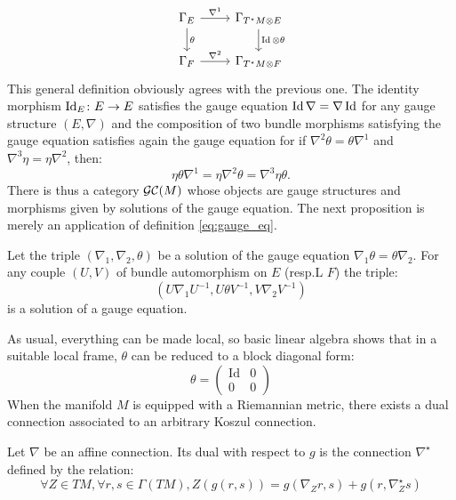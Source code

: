 \begin{equation}
    \label{eq:koszul_exterior_der}
    \begin{tikzcd}
    \Gamma_E \rar["\nabla^1"] \dar["\theta"] & \Gamma_{T^\star M  \otimes E} \dar["\Id \otimes \theta"]\\
    \Gamma_F \rar["\nabla^2"] & \Gamma_{T^\star M \otimes F}
    \end{tikzcd}
\end{equation}
This general definition obviously agrees with the previous one. 
The identity morphism $\operatorname{Id}_E \colon E \to E$ satisfies the gauge equation $\operatorname{Id} \nabla = \nabla \operatorname{Id}$
 for any gauge structure $\left(E,\nabla\right)$ and the composition of two bundle morphisms satisfying the gauge equation satisfies
  again the gauge equation for if $\nabla^2 \theta = \theta \nabla^1$ and $\nabla^3 \eta = \eta \nabla^2$, then:
\[
\eta \theta \nabla^1 = \eta \nabla^2 \theta = \nabla^3 \eta \theta.
\]
There is thus a category $\mathcal{GC}(M)$ whose objects are gauge structures and morphisms given by solutions of the gauge equation.
The next proposition is merely an application of definition \ref{eq:gauge_eq}.
\begin{prop}
\label{prop:conjugate_connections}
Let the triple $\left(\nabla_1, \nabla_2,\theta \right)$ be a solution of the gauge equation $\nabla_1 \theta = \theta \nabla_2.$ 
For any couple $(U,V)$ of bundle automorphism on $E$ (resp.L $F$) the triple:
\[
\left( U \nabla_1 U^{-1}, U \theta V^{-1}, V \nabla_2 V^{-1} \right)
\]
is a solution of a gauge equation.
\end{prop}
As usual, everything can be made local, so basic linear algebra shows that in a suitable local frame, $\theta$ can be reduced to a block diagonal form:
\begin{equation}
    \label{eq:reduced_theta}
    \theta = \left( \begin{array}{c|c} \text{Id} & 0 \\ \hline
    0 & 0
    \end{array} \right)
\end{equation}
When the manifold $M$ is equipped with a Riemannian metric, there exists a dual connection associated to an arbitrary Koszul connection. 
\begin{defn}
    \label{def:conjugate_connection}
    Let $\nabla$ be an affine connection. Its dual with respect to $g$ is the connection $\nabla^\star$ defined by the relation:
    \begin{equation}
    \label{eq:conjugate_connection}
    \forall Z \in TM, \forall r,s \in \Gamma \left(TM 
    \right), Z\left( g(r,s) \right) = g\left(\nabla_Z r, s\right) + 
    g\left( r, \nabla_Z^\star s\right)
    \end{equation}
\end{defn}


